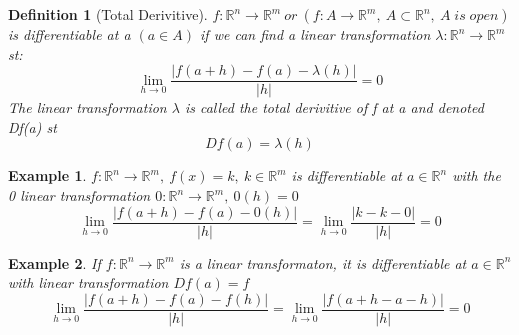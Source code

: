 \documentclass[11pt]{article}
\def\RR{\mathbb{R}}
\newtheorem{definition}{Definition}[section]
\newtheorem{example}{Example}[section]
\begin{document}
\begin{definition}[Total Derivitive]\label{D:Total Derivitive}
$f:\RR^{n} \rightarrow \RR^{m}\: or \:(f:A \rightarrow \RR^{m}, \: A \subset \RR^{n}, \:A\;is\;open)$
is differentiable at a $(a \in A)$ if we can find a linear transformation $ \lambda:\RR^{n} \rightarrow \RR^{m}$ st:
\[\lim_{h \to 0}\frac{|f(a+h) - f(a) - \lambda(h)|}{|h|} =0 \]
The linear transformation $\lambda$ is called the total derivitive of f at a and denoted Df(a) st
\[Df(a)=\lambda(h)\] 
\end{definition}

\begin{example} 
$f:\RR^{n} \rightarrow \RR^{m}, \: f(x)=k, \: k \in\RR^{m} $ is differentiable at $a\in\RR^{n}$ with the 0 linear transformation $0:\RR^{n} \rightarrow \RR^{m}, \: 0(h)=0$
\[\lim_{h \to 0}\frac{|f(a+h) - f(a) - 0(h)|}{|h|} = \lim_{h \to 0}\frac{|k - k - 0|}{|h|}= 0 \]
\end{example}

\begin{example}
If $f:\RR^{n} \rightarrow \RR^{m}$ is a linear transformaton, it is differentiable at $a\in\RR^{n}$ with linear transformation $Df(a) = f$
\[\lim_{h \to 0}\frac{|f(a+h) - f(a) - f(h)|}{|h|}= \lim_{h \to 0}\frac{|f(a+h -a -h)|}{|h|} = 0\]
\end{example}
\end{document}
